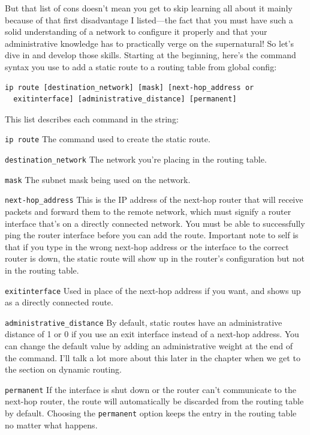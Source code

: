 But that list of cons doesn't mean you get to skip learning all about it
mainly because of that first disadvantage I listed---the fact that you
must have such a solid understanding of a network to configure it
properly and that your administrative knowledge has to practically
\protect\hypertarget{c09.xhtmlux5cux23Page_383}{}{}verge on the
supernatural! So let's dive in and develop those skills. Starting at the
beginning, here's the command syntax you use to add a static route to a
routing table from global config:

\begin{verbatim}
ip route [destination_network] [mask] [next-hop_address or
  exitinterface] [administrative_distance] [permanent]
\end{verbatim}

This list describes each command in the string:

\texttt{ip\ route} The command used to create the static route.

\texttt{destination\_network} The network you're placing in the routing
table.

\texttt{mask} The subnet mask being used on the network.

\texttt{next-hop\_address} This is the IP address of the next-hop router
that will receive packets and forward them to the remote network, which
must signify a router interface that's on a directly connected network.
You must be able to successfully ping the router interface before you
can add the route. Important note to self is that if you type in the
wrong next-hop address or the interface to the correct router is down,
the static route will show up in the router's configuration but not in
the routing table.

\texttt{exitinterface} Used in place of the next-hop address if you
want, and shows up as a directly connected route.

\texttt{administrative\_distance} By default, static routes have an
administrative distance of 1 or 0 if you use an exit interface instead
of a next-hop address. You can change the default value by adding an
administrative weight at the end of the command. I'll talk a lot more
about this later in the chapter when we get to the section on dynamic
routing.

\texttt{permanent} If the interface is shut down or the router can't
communicate to the next-hop router, the route will automatically be
discarded from the routing table by default. Choosing the
\texttt{permanent} option keeps the entry in the routing table no matter
what happens.

